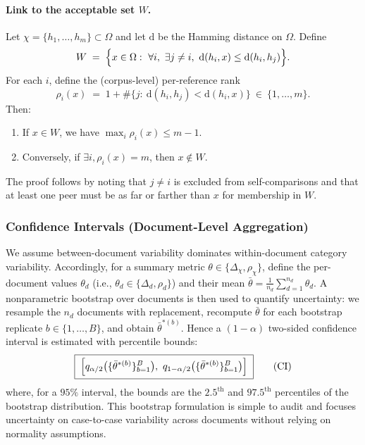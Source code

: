 \documentclass[12pt]{article}
\begin{document}
\paragraph{Link to the acceptable set $W$.}
Let $\chi=\{h_1,\dots,h_m\}\subset\Omega$ and let $\mathrm{d}$ be the Hamming distance on $\Omega$.
Define
\[
W \;=\; \Bigl\{x\in\Omega:\ \forall i,\ \exists j\neq i,\ \mathrm{d}(h_i,x)\le \mathrm{d}(h_i,h_j)\Bigr\}.
\]
For each $i$, define the (corpus-level) per-reference rank
\[
\rho_i(x)\;=\;1+\#\bigl\{j:\ \mathrm{d}(h_i,h_j)<\mathrm{d}(h_i,x)\bigr\}\ \in\ \{1,\dots,m\}.
\]
Then:
\begin{enumerate}
\item If $x\in W$, we have $\max_i \rho_i(x)\le m-1$.
\item Conversely, if $\exists i, \rho_i(x) = m$, then $x\notin W$.
\end{enumerate}
The proof follows by noting that $j\neq i$ is excluded from self-comparisons and that at least one peer must be as far or farther than $x$ for membership in $W$.

\subsubsection{Confidence Intervals (Document-Level Aggregation)}
We assume between-document variability dominates within-document category variability.
Accordingly, for a summary metric $\theta\in\{\Delta_{\chi},\rho_{\chi}\}$, define the per-document values
$\theta_d$ (i.e., $\theta_d\in\{\Delta_d,\rho_d\}$) and their mean $\bar{\theta}=\tfrac{1}{n_d}\sum_{d=1}^{n_d}\theta_d$.
A nonparametric bootstrap over documents is then used to quantify uncertainty: we resample
the $n_d$ documents with replacement, recompute $\bar{\theta}$ for each bootstrap replicate
$b\in\{1,\dots,B\}$, and obtain $\bar{\theta}^{*(b)}$.
Hence a $(1-\alpha)$ two-sided confidence interval is estimated with percentile bounds:
\[
\boxed{\;\Bigl[q_{\alpha/2}\bigl(\{\bar{\theta}^{*(b)}\}_{b=1}^{B}\bigr),\ 
q_{1-\alpha/2}\bigl(\{\bar{\theta}^{*(b)}\}_{b=1}^{B}\bigr)\Bigr]\;}\tag{CI}
\]
where, for a $95\%$ interval, the bounds are the $2.5^{\text{th}}$ and $97.5^{\text{th}}$
percentiles of the bootstrap distribution.
This bootstrap formulation is simple to audit and focuses uncertainty on case-to-case
variability across documents without relying on normality assumptions.
\end{document}
